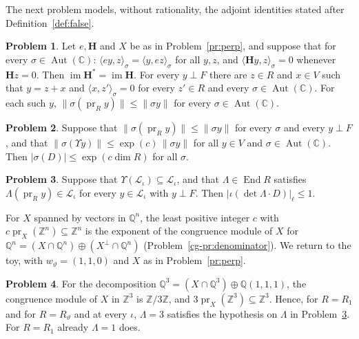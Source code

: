 \documentclass[reqno]{amsart}
\theoremstyle{definition}
\newtheorem{problem}{Problem}[section]
\theoremstyle{plain}
\theoremstyle{remark}
\newcommand{\Z}{{\mathbb{Z}}}
\newcommand{\Q}{{\mathbb{Q}}}
\newcommand{\C}{{\mathbb{C}}}
\newcommand{\Lc}{{\mathcal{L}}}
\newcommand{\Hb}{{\mathbf{H}}}
\newcommand{\pr}{\operatorname{pr}}
\newcommand{\im}{\operatorname{im}}
\newcommand{\End}{\operatorname{End}}
\newcommand{\Aut}{\operatorname{Aut}}
\begin{document}
The next problem models, without rationality, the adjoint identities stated after Definition~\ref{def:false}.

\begin{problem}\label{pr:sigma}
Let \(e, \Hb\) and \(X\) be as in Problem~\ref{pr:perp}, and suppose that for every \(\sigma \in \Aut(\C)\): \(\langle e y, z\rangle_\sigma = \langle y, e z\rangle_\sigma\) for all \(y, z\), and \(\langle \Hb y, z\rangle_\sigma = 0\) whenever \(\Hb z = 0\).  Then \(\im\Hb^*=\im\Hb\).  For every \(y\perp F\) there are \(z\in R\) and \(x\in V\) such that \(y=z+x\) and \(\langle x,z'\rangle_\sigma=0\) for every \(z'\in R\) and every \(\sigma\in\Aut(\C)\).  For each such \(y\), \(\lVert\sigma(\pr_R y)\rVert\le\lVert\sigma y\rVert\) for every \(\sigma\in\Aut(\C)\).
\end{problem}

\begin{problem}\label{pr:arch}
Suppose that \(\lVert\sigma(\pr_R y)\rVert \le \lVert\sigma y\rVert\) for every \(\sigma\) and every \(y \perp F\), and that \(\lVert\sigma(\Upsilon y)\rVert \le \exp(c)\,\lVert\sigma y\rVert\) for all \(y \in V\) and \(\sigma \in \Aut(\C)\).  Then \(\lvert\sigma(D)\rvert \le \exp(c\dim R)\) for all \(\sigma\).
\end{problem}

\begin{problem}\label{pr:padic}
Suppose that \(\Upsilon(\Lc_\iota) \subseteq \Lc_\iota\), and that \(\Lambda \in \End R\) satisfies \(\Lambda(\pr_R y) \in \Lc_\iota\) for every \(y \in \Lc_\iota\) with \(y \perp F\).  Then \(\lvert\iota(\det\Lambda \cdot D)\rvert_\ell \le 1\).
\end{problem}

For \(X\) spanned by vectors in \(\Q^n\), the least positive integer \(c\) with \(c\pr_X(\Z^n)\subseteq\Z^n\) is the exponent of the congruence module of \(X\) for \(\Q^n=(X\cap\Q^n)\oplus(X^\perp\cap\Q^n)\) (Problem~\ref{cg-pr:denominator}).  We return to the toy, with \(w_\vartheta=(1,1,0)\) and \(X\) as in Problem~\ref{pr:perp}.

\begin{problem}\label{pr:toy-cong}
For the decomposition \(\Q^3 = (X \cap \Q^3) \oplus \Q(1,1,1)\), the congruence module of \(X\) in \(\Z^3\) is \(\Z/3\Z\), and \(3\pr_X(\Z^3) \subseteq \Z^3\).  Hence, for \(R = R_1\) and for \(R = R_\vartheta\) and at every \(\iota\), \(\Lambda = 3\) satisfies the hypothesis on \(\Lambda\) in Problem~\ref{pr:padic}.  For \(R = R_1\) already \(\Lambda = 1\) does.
\end{problem}
\end{document}
